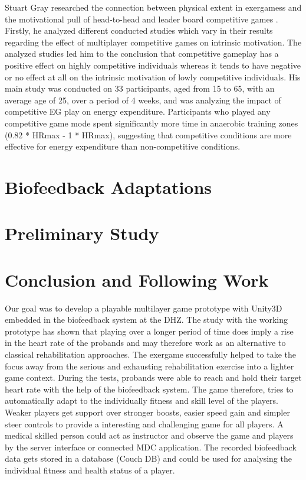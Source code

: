 \begin{multicols}{2}
Stuart Gray researched the connection between physical extent in exergamess and the motivational pull of head-to-head and leader board competitive games \cite{Gray2013}. Firstly, he analyzed different conducted studies which vary in their results regarding the effect of multiplayer competitive games on intrinsic motivation. The analyzed studies led him to the conclusion that competitive gameplay has a positive effect on highly competitive individuals whereas it tends to have negative or no effect at all on the intrinsic motivation of lowly competitive individuals. His main study was conducted on 33 participants, aged from 15 to 65, with an average age of 25, over a period of 4 weeks, and was analyzing the impact of competitive EG play on energy expenditure. Participants who played any competitive game mode spent significantly more time in anaerobic training zones (0.82 * HRmax - 1 * HRmax), suggesting that competitive conditions are more effective for energy expenditure than non-competitive conditions.


\section{Biofeedback Adaptations}

\section{Preliminary Study}

\section{Conclusion and Following Work}
Our goal was to develop a playable multilayer game prototype with Unity3D embedded in the biofeedback system at the DHZ. The study with the working prototype has shown that playing over a longer period of time does imply a rise in the heart rate of the probands and may therefore work as an alternative to classical rehabilitation approaches. The exergame successfully helped to take the focus away from the serious and exhausting rehabilitation exercise into a lighter game context. During the tests, probands were able to reach and hold their target heart rate with the help of the biofeedback system. The game therefore, tries to automatically adapt to the individually fitness and skill level of the players. Weaker players get support over stronger boosts, easier speed gain and simpler steer controls to provide a interesting and challenging game for all players. A medical skilled person could act as instructor and observe the game and players by the server interface or connected MDC application. The recorded biofeedback data gets stored in a database (Couch DB) and could be used for analysing the individual fitness and health status of a player.


\end{multicols}
